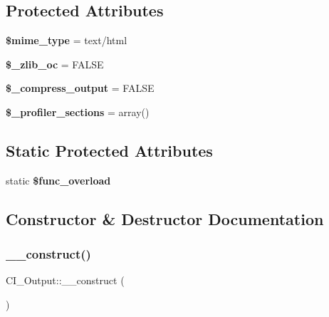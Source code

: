 \subsection*{Protected Attributes}
\begin{DoxyCompactItemize}
\item 
\mbox{\label{class_c_i___output_ac83668a3354577273cd4de3557c51e6e}} 
{\bfseries \$mime\+\_\+type} = \textquotesingle{}text/html\textquotesingle{}
\item 
\mbox{\label{class_c_i___output_a4529e0b9d05fe6912487ed23b3eb0666}} 
{\bfseries \$\+\_\+zlib\+\_\+oc} = F\+A\+L\+SE
\item 
\mbox{\label{class_c_i___output_a993b25635ff8b747b636b1efbc408c4e}} 
{\bfseries \$\+\_\+compress\+\_\+output} = F\+A\+L\+SE
\item 
\mbox{\label{class_c_i___output_aefcd201802d2f3de9e4b2a1ff0053088}} 
{\bfseries \$\+\_\+profiler\+\_\+sections} = array()
\end{DoxyCompactItemize}
\subsection*{Static Protected Attributes}
\begin{DoxyCompactItemize}
\item 
\mbox{\label{class_c_i___output_ace75394445a3f3c47ea7085e7f994697}} 
static {\bfseries \$func\+\_\+overload}
\end{DoxyCompactItemize}


\subsection{Constructor \& Destructor Documentation}
\mbox{\label{class_c_i___output_a91c41a5901975381c86c88bf6b2fbb95}} 
\subsubsection{\texorpdfstring{\+\_\+\+\_\+construct()}{\_\_construct()}}
{\footnotesize\ttfamily C\+I\+\_\+\+Output\+::\+\_\+\+\_\+construct (\begin{DoxyParamCaption}{ }\end{DoxyParamCaption})}

